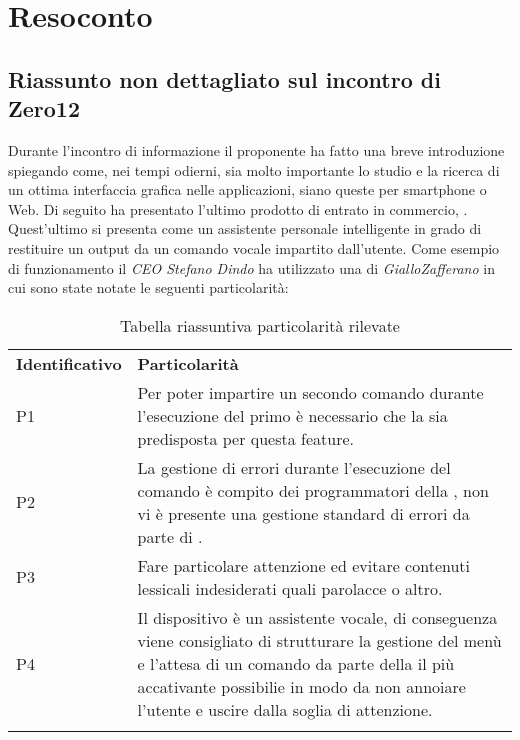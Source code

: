 \clearpage
\section{Resoconto}
	\subsection{Riassunto non dettagliato sul incontro di Zero12}
	Durante l'incontro di informazione il proponente ha fatto una breve introduzione spiegando come, nei tempi odierni, sia molto importante lo studio e la ricerca di un ottima interfaccia grafica nelle applicazioni, siano queste per smartphone o Web. 
	Di seguito ha presentato l'ultimo prodotto di  entrato in commercio,  . Quest'ultimo si presenta come un assistente personale intelligente in grado di restituire un output da un comando vocale impartito dall'utente. 
	Come esempio di funzionamento il \emph{CEO Stefano Dindo} ha utilizzato una  di \emph{GialloZafferano} in cui sono state notate le seguenti particolarità:
	
	\begin{center}
		\renewcommand{\arraystretch}{1.5}
		\begin{longtable}{  p{3cm} p{11.2cm} }
			\rowcolor{tableHeadYellow}
			\textbf{Identificativo}&\textbf{Particolarità}\\
			P1 & Per poter impartire un secondo comando durante l'esecuzione del primo è necessario che la \markg{skill} sia predisposta per questa feature.\\
			P2 & La gestione di errori durante l'esecuzione del comando è compito dei programmatori della \markg{skill}, non vi è presente una gestione standard di errori da parte di \markg{Alexa}.\\
			P3 & Fare particolare attenzione ed evitare contenuti lessicali indesiderati quali parolacce o altro.\\
			P4 & Il dispositivo è un assistente vocale, di conseguenza viene consigliato di strutturare la gestione del menù e l'attesa di un comando da parte della \markg{skill} il più accativante possibilie in modo da non annoiare l'utente e uscire dalla soglia di attenzione.\\
			\rowcolor{white}
			\caption{Tabella riassuntiva particolarità rilevate}
		\end{longtable}	
	\end{center}
	\clearpage
